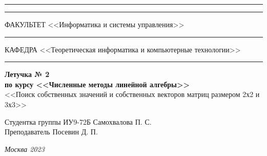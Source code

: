 \documentclass[a4paper, 14pt]{extarticle}
\begin{document}
\begin{titlepage}
\vspace{-25pt}
\hspace{-35pt}\rule{\textwidth}{2.3pt}

\vspace*{-20.3pt}
\hspace{-35pt}\rule{\textwidth}{0.4pt}

\vspace{1.5ex}
\hspace{-35pt} \noindent \small ФАКУЛЬТЕТ\hspace{80pt} <<Информатика и системы управления>>

\vspace*{-16pt}
\hspace{47pt}\rule{0.83\textwidth}{0.4pt}

\vspace{0.5ex}
\hspace{-35pt} \noindent \small КАФЕДРА\hspace{50pt} <<Теоретическая информатика и компьютерные технологии>>

\vspace*{-16pt}
\hspace{30pt}\rule{0.866\textwidth}{0.4pt}
  
\vspace{11em}

\begin{center}
\Large {\bf Летучка № 2} \\
\large {\bf по курсу <<Численные методы линейной алгебры>>} \\
\large <<Поиск собственных значений и собственных векторов матриц размером 2х2 и 3х3>>
\end{center}\normalsize

\vspace{8em}


\begin{flushright}
  {Студентка группы ИУ9-72Б Самохвалова П. С. \hspace*{15pt}\\
  \vspace{2ex}
  Преподаватель Посевин Д. П.\hspace*{15pt}}
\end{flushright}

\bigskip

\vfill
 

\begin{center}
\textsl{Москва 2023}
\end{center}
\end{titlepage}
\end{document}
